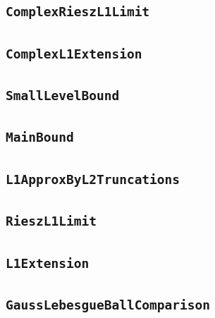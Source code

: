 \documentclass[11pt]{amsart}
\theoremstyle{definition}
\begin{document}
\subsection{\texorpdfstring{\texttt{ComplexRieszL1Limit}}{ComplexRieszL1Limit}}\label{node:ComplexRieszL1Limit}


\subsection{\texorpdfstring{\texttt{ComplexL1Extension}}{ComplexL1Extension}}\label{node:ComplexL1Extension}


\subsection{\texorpdfstring{\texttt{SmallLevelBound}}{SmallLevelBound}}\label{node:SmallLevelBound}


\subsection{\texorpdfstring{\texttt{MainBound}}{MainBound}}\label{node:MainBound}


\subsection{\texorpdfstring{\texttt{L1ApproxByL2Truncations}}{L1ApproxByL2Truncations}}\label{node:L1ApproxByL2Truncations}


\subsection{\texorpdfstring{\texttt{RieszL1Limit}}{RieszL1Limit}}\label{node:RieszL1Limit}


\subsection{\texorpdfstring{\texttt{L1Extension}}{L1Extension}}\label{node:L1Extension}


\subsection{\texorpdfstring{\texttt{GaussLebesgueBallComparison}}{GaussLebesgueBallComparison}}\label{node:GaussLebesgueBallComparison}

\end{document}
